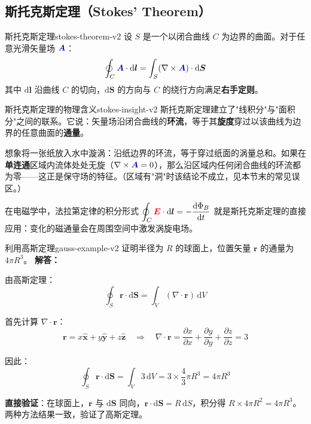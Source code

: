 \documentclass[11pt,a4paper,openany,oneside]{book}
\newcommand{\diff}{\mathrm{d}}
\newcommand{\vecE}{\textcolor{red}{\vect{E}}}
\newcommand{\vecA}{\textcolor{blue!70!black}{\vect{A}}}
\newcommand{\vect}[1]{\bm{#1}}
\newcommand{\unitvec}[1]{\hat{\vect{#1}}}
\newcommand{\curl}{\nabla\times}
\newcommand{\divg}{\nabla\cdot}
\newcommand{\difficulty}[1]{\marginnote{\textcolor{red}{\textbf{[#1]}}}}
\begin{document}
\subsection{斯托克斯定理（Stokes' Theorem）}

\begin{theorem}{斯托克斯定理}{stokes-theorem-v2}
设 $S$ 是一个以闭合曲线 $C$ 为边界的曲面。对于任意光滑矢量场 $\vecA$：
\[
\oint_C \vecA \cdot \diff\vect{l} = \int_S (\curl\vecA) \cdot \diff\vect{S}
\]
其中 $\diff\vect{l}$ 沿曲线 $C$ 的切向，$\diff\vect{S}$ 的方向与 $C$ 的绕行方向满足\textbf{右手定则}。
\end{theorem}

\begin{insight}{斯托克斯定理的物理含义}{stokes-insight-v2}
斯托克斯定理建立了"线积分"与"面积分"之间的联系。它说：矢量场沿闭合曲线的\textbf{环流}，等于其\textbf{旋度}穿过以该曲线为边界的任意曲面的\textbf{通量}。

想象将一张纸放入水中漩涡：沿纸边界的环流，等于穿过纸面的涡量总和。如果在\textbf{单连通}区域内流体处处无旋（$\curl\vecA = 0$），那么沿区域内任何闭合曲线的环流都为零——这正是保守场的特征。（区域有"洞"时该结论不成立，见本节末的常见误区。）

在电磁学中，法拉第定律的积分形式 $\displaystyle\oint_C \vecE \cdot \diff\vect{l} = -\dfrac{\diff\Phi_B}{\diff t}$ 就是斯托克斯定理的直接应用：变化的磁通量会在周围空间中激发涡旋电场。
\end{insight}

\begin{example}{利用高斯定理}{gauss-example-v2}
\difficulty{基础}
证明半径为 $R$ 的球面上，位置矢量 $\vect{r}$ 的通量为 $4\pi R^3$。
\tcblower
\textbf{解答：}

由高斯定理：
\[
\oint_S \vect{r} \cdot \diff\vect{S} = \int_V (\divg\vect{r}) \, \diff V
\]

首先计算 $\divg\vect{r}$：
\[
\vect{r} = x\unitvec{x} + y\unitvec{y} + z\unitvec{z} \quad\Rightarrow\quad \divg\vect{r} = \frac{\partial x}{\partial x} + \frac{\partial y}{\partial y} + \frac{\partial z}{\partial z} = 3
\]

因此：
\[
\oint_S \vect{r} \cdot \diff\vect{S} = \int_V 3 \, \diff V = 3 \times \frac{4}{3}\pi R^3 = 4\pi R^3
\]

\textbf{直接验证}：在球面上，$\vect{r}$ 与 $\diff\vect{S}$ 同向，$\vect{r} \cdot \diff\vect{S} = R \, \diff S$，积分得 $R \times 4\pi R^2 = 4\pi R^3$。两种方法结果一致，验证了高斯定理。
\end{example}
\end{document}
